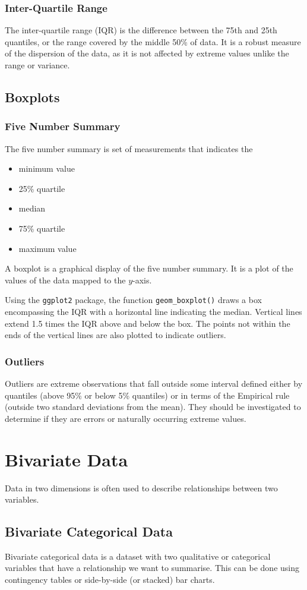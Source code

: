 \documentclass{article}
\begin{document}
\subsubsection{Inter-Quartile Range}
The inter-quartile range (IQR) is the difference between the 75th and 25th quantiles,
or the range covered by the middle 50\% of data. It is a robust measure of the dispersion of the data,
as it is not affected by extreme values unlike the range or variance.
\subsection{Boxplots}
\subsubsection{Five Number Summary}
The five number summary is set of measurements that indicates the
\begin{itemize}
    \item minimum value
    \item 25\% quartile
    \item median
    \item 75\% quartile
    \item maximum value
\end{itemize}
A boxplot is a graphical display of the five number summary.
It is a plot of the values of the data mapped to the \(y\)-axis.

Using the \texttt{ggplot2} package, the function \texttt{geom_boxplot()} draws
a box encompassing the IQR with a horizontal line indicating the median.
Vertical lines extend 1.5 times the IQR above and below the box. The points not within
the ends of the vertical lines are also plotted to indicate outliers.
\subsubsection{Outliers}
Outliers are extreme observations that fall outside some
interval defined either by quantiles (above 95\% or below 5\% quantiles) or in terms of the Empirical rule
(outside two standard deviations from the mean).
They should be investigated to determine if they are errors or naturally occurring
extreme values.
\section{Bivariate Data}
Data in two dimensions is often used to describe relationships between two variables.
\subsection{Bivariate Categorical Data}
Bivariate categorical data is a dataset with two qualitative or categorical variables that have
a relationship we want to summarise. This can be done using contingency tables or side-by-side (or stacked) bar charts.
\end{document}
